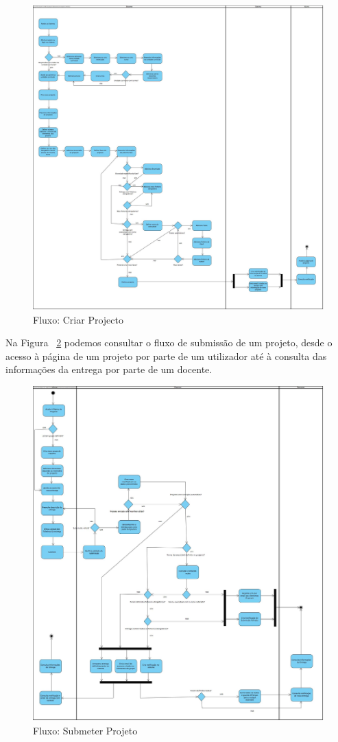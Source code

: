 \begin{figure}[H] 
  \centering
  \includegraphics[width=1\textwidth,center]{images/arquitetura/criacao-projecto}
  \caption{Fluxo: Criar Projecto}
  \label{fig:criacao-projecto}
\end{figure}

Na Figura ~\ref{fig:submissao-projecto} podemos consultar o fluxo de submissão de um projeto, desde o acesso à página de um projeto por parte de um utilizador até à consulta das informações da entrega por parte de um docente.

\begin{figure}[H] 
  \centering
  \includegraphics[width=1\textwidth,center]{images/arquitetura/submissao-projecto}
  \caption{Fluxo: Submeter Projeto}
  \label{fig:submissao-projecto}
\end{figure}
